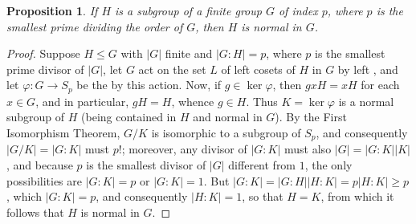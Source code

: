 \documentclass[12pt]{article}
\theoremstyle{plain}
\newtheorem*{prop*}{Proposition}
\newcommand{\abs}[1]{\vert#1\vert}
\begin{document}
\begin{prop*}
If $H$ is a subgroup of a finite group $G$ of index $p$, where $p$ is the smallest prime dividing the order of $G$, then $H$ is normal in $G$.
\end{prop*}
\begin{proof}
Suppose $H\leq G$ with $\abs{G}$ finite and $\abs{G:H}=p$, where $p$ is the smallest prime divisor of $\abs{G}$, let $G$ act on the set $L$ of left cosets of $H$ in $G$ by left , and let $\varphi:G\rightarrow S_p$ be the  by this action. Now, if $g\in\ker\varphi$, then $gxH=xH$ for each $x\in G$, and in particular, $gH=H$, whence $g\in H$. Thus $K=\ker\varphi$ is a normal subgroup of $H$ (being contained in $H$ and normal in $G$). By the First Isomorphism Theorem, $G/K$ is isomorphic to a subgroup of $S_p$, and consequently $\abs{G/K}=\abs{G:K}$ must  $p!$; moreover, any divisor of $\abs{G:K}$ must also  $\abs{G}=\abs{G:K}\abs{K}$, and because $p$ is the smallest divisor of $\abs{G}$ different from $1$, the only possibilities are $\abs{G:K}=p$ or $\abs{G:K}=1$. But $\abs{G:K}=\abs{G:H}\abs{H:K}=p\abs{H:K}\geq p$, which  $\abs{G:K}=p$, and consequently $\abs{H:K}=1$, so that $H=K$, from which it follows that $H$ is normal in $G$.
\end{proof}

\end{document}
